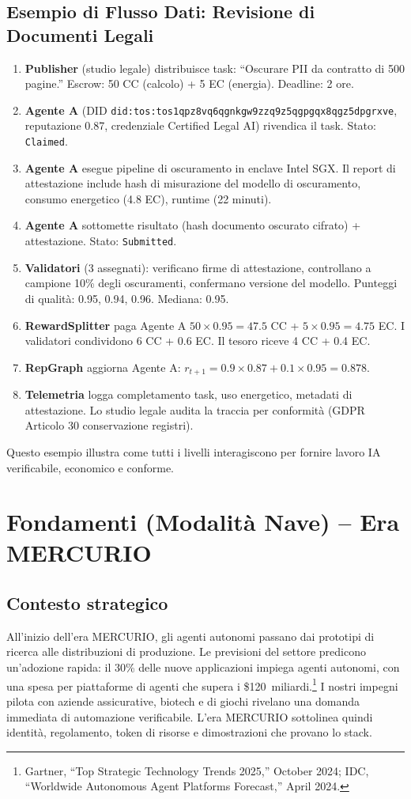 \documentclass[11pt]{article}
\begin{document}
\subsection{Esempio di Flusso Dati: Revisione di Documenti Legali}
\begin{enumerate}[label=\arabic*.]
  \item \textbf{Publisher} (studio legale) distribuisce task: ``Oscurare PII da contratto di 500 pagine.'' Escrow: 50 CC (calcolo) + 5 EC (energia). Deadline: 2 ore.
  \item \textbf{Agente A} (DID \texttt{did:tos:tos1qpz8vq6qgnkgw9zzq9z5qgpgqx8qgz5dpgrxve}, reputazione 0.87, credenziale Certified Legal AI) rivendica il task. Stato: \texttt{Claimed}.
  \item \textbf{Agente A} esegue pipeline di oscuramento in enclave Intel SGX. Il report di attestazione include hash di misurazione del modello di oscuramento, consumo energetico (4.8 EC), runtime (22 minuti).
  \item \textbf{Agente A} sottomette risultato (hash documento oscurato cifrato) + attestazione. Stato: \texttt{Submitted}.
  \item \textbf{Validatori} (3 assegnati): verificano firme di attestazione, controllano a campione 10\% degli oscuramenti, confermano versione del modello. Punteggi di qualità: 0.95, 0.94, 0.96. Mediana: 0.95.
  \item \textbf{RewardSplitter} paga Agente A $50 \times 0.95 = 47.5$ CC + $5 \times 0.95 = 4.75$ EC. I validatori condividono 6 CC + 0.6 EC. Il tesoro riceve 4 CC + 0.4 EC.
  \item \textbf{RepGraph} aggiorna Agente A: $r_{t+1} = 0.9 \times 0.87 + 0.1 \times 0.95 = 0.878$.
  \item \textbf{Telemetria} logga completamento task, uso energetico, metadati di attestazione. Lo studio legale audita la traccia per conformità (GDPR Articolo 30 conservazione registri).
\end{enumerate}

Questo esempio illustra come tutti i livelli interagiscono per fornire lavoro IA verificabile, economico e conforme.

\section{Fondamenti (Modalità Nave) -- Era MERCURIO}
\subsection{Contesto strategico}
All'inizio dell'era MERCURIO, gli agenti autonomi passano dai prototipi di ricerca alle distribuzioni di produzione. Le previsioni del settore predicono un'adozione rapida: il 30\% delle nuove applicazioni impiega agenti autonomi, con una spesa per piattaforme di agenti che supera i \$120~miliardi.\footnote{Gartner, ``Top Strategic Technology Trends 2025,'' October 2024; IDC, ``Worldwide Autonomous Agent Platforms Forecast,'' April 2024.} I nostri impegni pilota con aziende assicurative, biotech e di giochi rivelano una domanda immediata di automazione verificabile. L'era MERCURIO sottolinea quindi identità, regolamento, token di risorse e dimostrazioni che provano lo stack.
\end{document}
